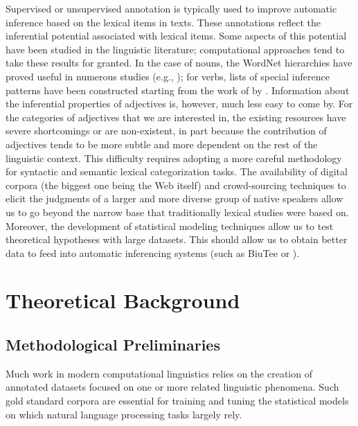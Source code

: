 \documentclass[10pt]{article}
\begin{document}
Supervised or unsupervised annotation is typically used to improve automatic inference based on the lexical items in texts. These annotations reflect the inferential potential associated with lexical items. Some aspects of this potential have been studied in the linguistic literature; computational approaches tend to take these results for granted. 
In the case of nouns, the WordNet hierarchies have proved useful in numerous studies (e.g., \cite{snow04}); for verbs, lists of special inference patterns have been constructed starting from the work of \cite{kiparsky+kiparsky:1970,karttunen:1971} by \cite{nairn+condoravdi+karttunen:2006,sauri:2008phd,factbank:2009,lotan:2012}. Information about the inferential properties of adjectives is, however, much less easy to come by. 
For the categories of adjectives that we are interested in, the existing resources have severe shortcomings or are non-existent, in part because the contribution of adjectives tends to be more subtle and more dependent on the rest of the linguistic context. This difficulty requires adopting a more careful methodology for syntactic and semantic lexical categorization tasks. The availability of digital corpora (the biggest one being the Web itself) and crowd-sourcing techniques to elicit the judgments of a larger and more diverse group of native speakers allow us to go beyond the narrow base that traditionally lexical studies were based on. Moreover, the development of statistical modeling techniques allow us to test theoretical hypotheses with large datasets. This should allow us to obtain better data to feed into automatic inferencing systems (such as BiuTee \cite{stern+dagan:2011} or \cite{clark2007role}).
 
\vspace{-.15in}

\vspace {-2mm}

\section{Theoretical Background}
\vspace{-.1in}
\subsection{Methodological Preliminaries\label{prelim}}
\vspace {-3mm}

Much work in modern computational linguistics relies on the creation of annotated datasets focused on one or more related linguistic phenomena. Such gold standard corpora are essential for training and tuning the statistical models on which natural language processing tasks largely rely.
\end{document}
